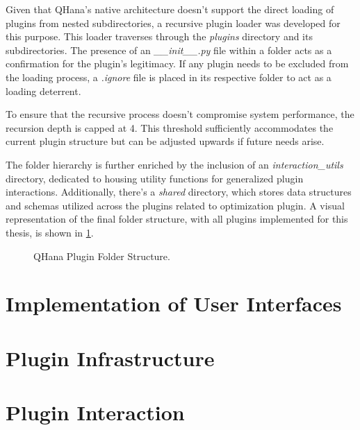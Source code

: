 \documentclass[
  a4paper,  %
  twoside,  %
  bibliography=totoc,
  headsepline,
  cleardoublepage=empty,
  parskip=half,
  draft=false
]{scrbook}
\begin{document}
Given that QHana's native architecture doesn't support the direct loading of plugins from nested subdirectories, a recursive plugin loader was developed for this purpose.
This loader traverses through the \textit{plugins} directory and its subdirectories.
The presence of an \textit{\_\_init\_\_.py} file within a folder acts as a confirmation for the plugin's legitimacy.
If any plugin needs to be excluded from the loading process, a \textit{.ignore} file is placed in its respective folder to act as a loading deterrent.

To ensure that the recursive process doesn’t compromise system performance, the recursion depth is capped at 4.
This threshold sufficiently accommodates the current plugin structure but can be adjusted upwards if future needs arise.

The folder hierarchy is further enriched by the inclusion of an \textit{interaction\_utils} directory, dedicated to housing utility functions for generalized plugin interactions.
Additionally, there's a \textit{shared} directory, which stores data structures and schemas utilized across the plugins related to optimization plugin.
A visual representation of the final folder structure, with all plugins implemented for this thesis, is shown in \cref{fig:folderStructure}.


\begin{figure}[h!]
  \caption{QHana Plugin Folder Structure.}
  \label{fig:folderStructure}
\end{figure}


\section{Implementation of User Interfaces}



\section{Plugin Infrastructure}
\label{sec:pluginInfrastructure}
\section{Plugin Interaction}
\label{sec:pluginInteraction}
\end{document}

